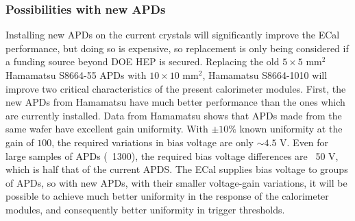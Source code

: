 \subsubsection{Possibilities with new APDs} 

Installing new APDs on the current crystals will significantly improve the ECal performance, but doing so is expensive,  so replacement is only being considered if a funding source beyond DOE HEP is secured. Replacing the old $5\times 5$ mm$^2$ 
Hamamatsu S8664-55 APDs with $10\times 10$ mm$^2$, Hamamatsu S8664-1010 will improve two critical characteristics of the present calorimeter modules. First, the new APDs from Hamamatsu have much better performance than the ones which are currently installed. Data from Hamamatsu shows that APDs made from the same wafer have excellent gain uniformity. With $\pm 10\%$ known uniformity 
at the gain of $100$, the required variations in bias voltage are only $\sim 4.5$ V. Even for large samples of APDs (~1300),  the required bias voltage differences are ~50 V, which is half that of the current APDS. The ECal supplies bias voltage to groups of APDs, so with new APDs, with their smaller voltage-gain variations, it will be possible to achieve much better 
uniformity in the response of the calorimeter modules, and consequently better uniformity in trigger thresholds. 


